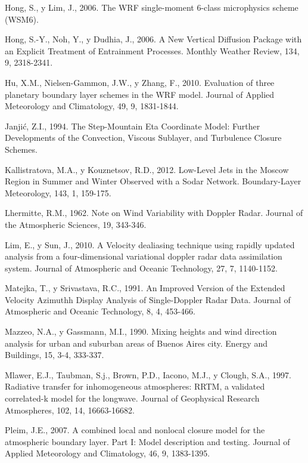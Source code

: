 \documentclass[12pt,spanish,oneside]{book}
\begin{document}
\hypertarget{ref-Hong2006a}{}
Hong, S., y Lim, J., 2006. The WRF single-moment 6-class microphysics
scheme (WSM6).

\hypertarget{ref-Hong2006}{}
Hong, S.-Y., Noh, Y., y Dudhia, J., 2006. A New Vertical Diffusion
Package with an Explicit Treatment of Entrainment Processes. Monthly
Weather Review, 134, 9, 2318-2341.

\hypertarget{ref-Hu2010}{}
Hu, X.M., Nielsen-Gammon, J.W., y Zhang, F., 2010. Evaluation of three
planetary boundary layer schemes in the WRF model. Journal of Applied
Meteorology and Climatology, 49, 9, 1831-1844.

\hypertarget{ref-Janjic1994}{}
Janjić, Z.I., 1994. The Step-Mountain Eta Coordinate Model: Further
Developments of the Convection, Viscous Sublayer, and Turbulence Closure
Schemes.

\hypertarget{ref-Kallistratova2012}{}
Kallistratova, M.A., y Kouznetsov, R.D., 2012. Low-Level Jets in the
Moscow Region in Summer and Winter Observed with a Sodar Network.
Boundary-Layer Meteorology, 143, 1, 159-175.

\hypertarget{ref-Lhermitte1962}{}
Lhermitte, R.M., 1962. Note on Wind Variability with Doppler Radar.
Journal of the Atmospheric Sciences, 19, 343-346.

\hypertarget{ref-Lim2010}{}
Lim, E., y Sun, J., 2010. A Velocity dealiasing technique using rapidly
updated analysis from a four-dimensional variational doppler radar data
assimilation system. Journal of Atmospheric and Oceanic Technology, 27,
7, 1140-1152.

\hypertarget{ref-Matejka1991}{}
Matejka, T., y Srivastava, R.C., 1991. An Improved Version of the
Extended Velocity Azimuthh Display Analysis of Single-Doppler Radar
Data. Journal of Atmospheric and Oceanic Technology, 8, 4, 453-466.

\hypertarget{ref-Mazzeo1990}{}
Mazzeo, N.A., y Gassmann, M.I., 1990. Mixing heights and wind direction
analysis for urban and suburban areas of Buenos Aires city. Energy and
Buildings, 15, 3-4, 333-337.

\hypertarget{ref-Mlawer1997}{}
Mlawer, E.J., Taubman, S.j., Brown, P.D., Iacono, M.J., y Clough, S.A.,
1997. Radiative transfer for inhomogeneous atmospheres: RRTM, a
validated correlated-k model for the longwave. Journal of Geophysical
Research Atmospheres, 102, 14, 16663-16682.

\hypertarget{ref-Pleim2007}{}
Pleim, J.E., 2007. A combined local and nonlocal closure model for the
atmospheric boundary layer. Part I: Model description and testing.
Journal of Applied Meteorology and Climatology, 46, 9, 1383-1395.
\end{document}
